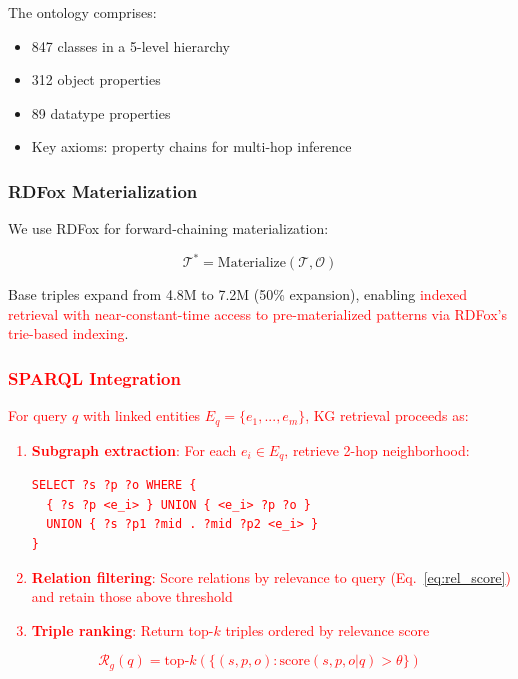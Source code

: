 \documentclass[10pt,twocolumn]{article}
\newcommand{\revisioncritical}[1]{\textcolor{red}{#1}}
\begin{document}
The ontology comprises:
\begin{itemize}
    \item 847 classes in a 5-level hierarchy
    \item 312 object properties
    \item 89 datatype properties
    \item Key axioms: property chains for multi-hop inference
\end{itemize}

\subsubsection{RDFox Materialization}

We use RDFox \cite{rdfox2023} for forward-chaining materialization:

\begin{equation}
\mathcal{T}^* = \text{Materialize}(\mathcal{T}, \mathcal{O})
\end{equation}

Base triples expand from 4.8M to 7.2M (50\% expansion), enabling \revisioncritical{indexed retrieval with near-constant-time access to pre-materialized patterns via RDFox's trie-based indexing}.

\revisioncritical{
\subsubsection{SPARQL Integration}
\label{sec:sparql}

For query $q$ with linked entities $E_q = \{e_1, ..., e_m\}$, KG retrieval proceeds as:

\begin{enumerate}
    \item \textbf{Subgraph extraction}: For each $e_i \in E_q$, retrieve 2-hop neighborhood:
    \begin{verbatim}
SELECT ?s ?p ?o WHERE {
  { ?s ?p <e_i> } UNION { <e_i> ?p ?o }
  UNION { ?s ?p1 ?mid . ?mid ?p2 <e_i> }
}
    \end{verbatim}
    
    \item \textbf{Relation filtering}: Score relations by relevance to query (Eq.~\ref{eq:rel_score}) and retain those above threshold
    
    \item \textbf{Triple ranking}: Return top-$k$ triples ordered by relevance score
\end{enumerate}

\begin{equation}
\mathcal{R}_g(q) = \text{top-}k(\{(s,p,o) : \text{score}(s,p,o|q) > \theta\})
\end{equation}
}
\end{document}
